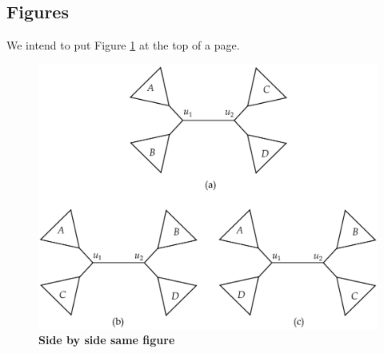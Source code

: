 \documentclass[14pt, a4paper]{article} %
\begin{document}
    \subsection{Figures}
    We intend to put Figure \ref{fig:1} at the top of a page.\pagebreak
    \begin{figure}[t!]
        \centering
        \includegraphics[width=0.75\linewidth]{Figure3.pdf}
        \caption{\label{fig:1}\textbf{Side by side same figure}}
    \end{figure}
\end{document}
